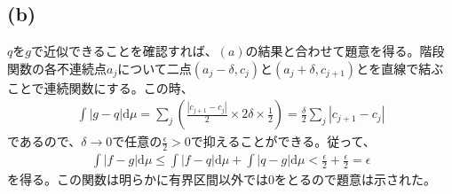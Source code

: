 \documentclass{article}
\begin{document}
\subsection{(b)}
$q$を$g$で近似できることを確認すれば、$(a)$の結果と合わせて題意を得る。階段関数の各不連続点$a_j$について二点$(a_j-\delta, c_j)$と$(a_j + \delta, c_{j+1})$とを直線で結ぶことで連続関数にする。この時、
\begin{align*}
	\int |g -q|\mathrm{d}\mu = \sum_j \left( \frac{|c_{j+1} - c_j|}{2} \times 2\delta \times \frac{1}{2} \right) = \frac{\delta}{2} \sum_j | c_{j+1} - c_j |
\end{align*}
であるので、$\delta \to 0$で任意の$\frac{\epsilon}{2} > 0$で抑えることができる。従って、
\begin{align*}
	\int |f-g|\mathrm{d}\mu \leq \int |f-q| \mathrm{d}\mu + \int |q-g | \mathrm{d}\mu < \frac{\epsilon}{2} + \frac{\epsilon}{2} = \epsilon
\end{align*}
を得る。この関数は明らかに有界区間以外では$0$をとるので題意は示された。
\end{document}
